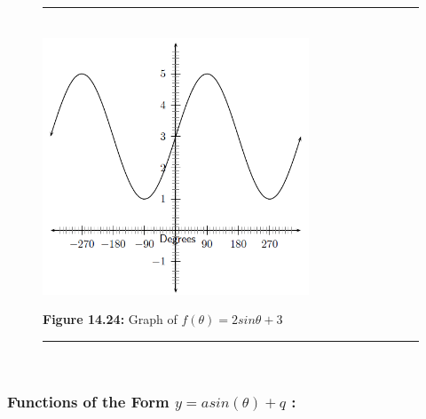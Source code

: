 	\begin{figure}[H] %
    \begin{center}
    \rule[.1in]{\figurerulewidth}{.005in} \\
        \label{m39414*uid33!!!underscore!!!media}\label{m39414*uid33!!!underscore!!!printimage}\includegraphics[width=300px]{col11306.imgs/m39414_trigrep.png} %
        
      \vspace{2pt}
    \vspace{\rubberspace}\par \begin{cnxcaption}
	  \small \textbf{Figure 14.24: }Graph of \begin{math}f\left(\theta \right)=2sin\theta +3\end{math}
	\end{cnxcaption}
      
    \vspace{.1in}
    \rule[.1in]{\figurerulewidth}{.005in} \\
        
    \end{center}

 \end{figure}   

    \addtocounter{footnote}{-0}
    
\label{m39414*secfhsst!!!underscore!!!id2083}
            \subsubsection{  Functions of the Form $y=asin\left(\theta \right)+q$ :}
            \nopagebreak
            
